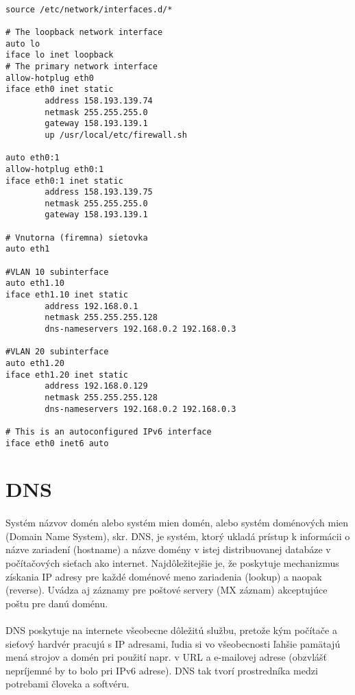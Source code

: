 \noindent
{\selectfont

\begin{small}

\begin{verbatim}

source /etc/network/interfaces.d/*

# The loopback network interface
auto lo
iface lo inet loopback
# The primary network interface
allow-hotplug eth0
iface eth0 inet static
        address 158.193.139.74
        netmask 255.255.255.0
        gateway 158.193.139.1
        up /usr/local/etc/firewall.sh

auto eth0:1
allow-hotplug eth0:1
iface eth0:1 inet static
        address 158.193.139.75
        netmask 255.255.255.0
        gateway 158.193.139.1

# Vnutorna (firemna) sietovka
auto eth1

#VLAN 10 subinterface
auto eth1.10
iface eth1.10 inet static
        address 192.168.0.1
        netmask 255.255.255.128
        dns-nameservers 192.168.0.2 192.168.0.3

#VLAN 20 subinterface
auto eth1.20
iface eth1.20 inet static
        address 192.168.0.129
        netmask 255.255.255.128
        dns-nameservers 192.168.0.2 192.168.0.3

# This is an autoconfigured IPv6 interface
iface eth0 inet6 auto

\end{verbatim}
\end{small}
}



\section{DNS}
\paragraph{}
Systém názvov domén alebo systém mien domén, alebo systém doménových mien (Domain Name System), skr. DNS, je systém, ktorý ukladá prístup k informácii o názve zariadení (hostname) a názve domény v istej distribuovanej databáze v počítačových sieťach ako internet. Najdôležitejšie je, že poskytuje mechanizmus získania IP adresy pre každé doménové meno zariadenia (lookup) a naopak (reverse). Uvádza aj záznamy pre poštové servery (MX záznam) akceptujúce poštu pre danú doménu.
\paragraph{}
DNS poskytuje na internete všeobecne dôležitú službu, pretože kým počítače a sieťový hardvér pracujú s IP adresami, ľudia si vo všeobecnosti ľahšie pamätajú mená strojov a domén pri použití napr. v URL a e-mailovej adrese (obzvlášť nepríjem\-né by to bolo pri IPv6 adrese). DNS tak tvorí prostredníka medzi potrebami človeka a softvéru.
